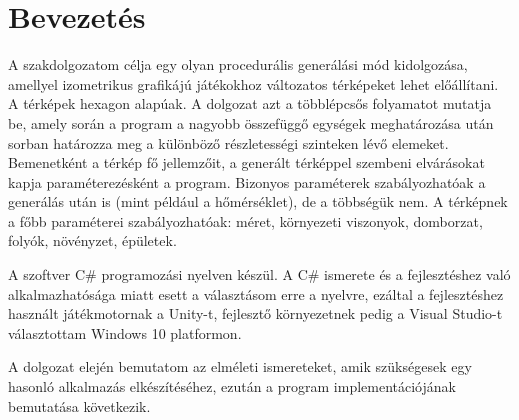 \chapter*{Bevezetés}

A szakdolgozatom célja egy olyan procedurális generálási mód kidolgozása, amellyel izometrikus grafikájú játékokhoz változatos térképeket lehet előállítani. A térképek hexagon alapúak. A dolgozat azt a többlépcsős folyamatot mutatja be, amely során a program a nagyobb összefüggő egységek meghatározása után sorban határozza meg a különböző részletességi szinteken lévő elemeket. Bemenetként a térkép fő jellemzőit, a generált térképpel szembeni elvárásokat kapja paraméterezésként a program. Bizonyos paraméterek szabályozhatóak a generálás után is (mint például a hőmérséklet), de a többségük nem. A térképnek a főbb paraméterei szabályozhatóak: méret, környezeti viszonyok, domborzat, folyók, növényzet, épületek. 

A szoftver C\# programozási nyelven készül. A C\# ismerete és a fejlesztéshez való alkalmazhatósága miatt esett a választásom erre a nyelvre, ezáltal a fejlesztéshez használt játékmotornak a Unity-t, fejlesztő környezetnek pedig a Visual Studio-t választottam Windows 10 platformon.

A dolgozat elején bemutatom az elméleti ismereteket, amik szükségesek egy hasonló alkalmazás elkészítéséhez, ezután a program implementációjának bemutatása következik.

